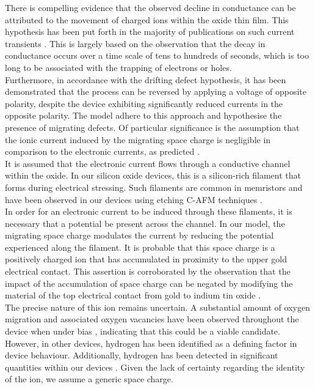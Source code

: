 \noindent There is compelling evidence that the observed decline in conductance can be attributed to the movement of charged ions within the oxide thin film. This hypothesis has been put forth in the majority of publications on such current transients \cite{wang2006oxygen}. This is largely based on the observation that the decay in conductance occurs over a time scale of tens to hundreds of seconds, which is too long to be associated with the trapping of electrons or holes. \\

\noindent Furthermore, in accordance with the drifting defect hypothesis, it has been demonstrated that the process can be reversed by applying a voltage of opposite polarity, despite the device exhibiting significantly reduced currents in the opposite polarity. The model adhere to this approach and hypothesise the presence of migrating defects. Of particular significance is the assumption that the ionic current induced by the migrating space charge is negligible in comparison to the electronic currents, as predicted \cite{meyer2005oxygen}. \\

\noindent It is assumed that the electronic current flows through a conductive channel within the oxide. In our silicon oxide devices, this is a silicon-rich filament that forms during electrical stressing. Such filaments are common in memristors and have been observed in our devices using etching C-AFM techniques \cite{buckwell2015conductance}.\\

\noindent In order for an electronic current to be induced through these filaments, it is necessary that a potential be present across the channel. In our model, the migrating space charge modulates the current by reducing the potential experienced along the filament. It is probable that this space charge is a positively charged ion that has accumulated in proximity to the upper gold electrical contact. This assertion is corroborated by the observation that the impact of the accumulation of space charge can be negated by modifying the material of the top electrical contact from gold to indium tin oxide \cite{mannion2022current}.\\

\noindent The precise nature of this ion remains uncertain. A substantial amount of oxygen migration and associated oxygen vacancies have been observed throughout the device when under bias \cite{vanka2022hydrogen}, indicating that this could be a viable candidate. However, in other devices, hydrogen has been identified as a defining factor in device behaviour. Additionally, hydrogen has been detected in significant quantities within our devices \cite{lagarias1998convergence}. Given the lack of certainty regarding the identity of the ion, we assume a generic space charge.\\


